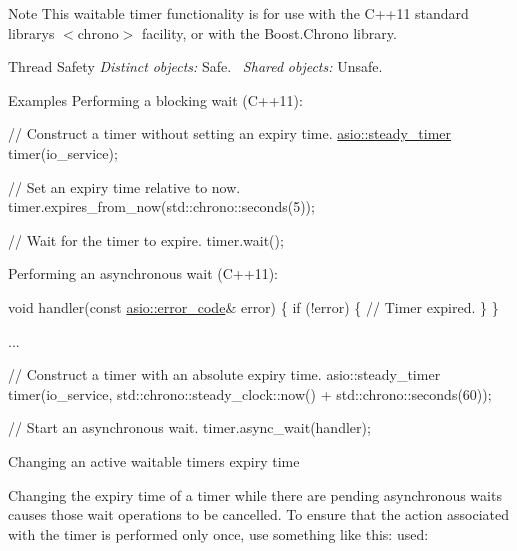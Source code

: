 \begin{DoxyNote}{Note}
This waitable timer functionality is for use with the C++11 standard library\textquotesingle{}s {\ttfamily $<$chrono$>$} facility, or with the Boost.\+Chrono library.
\end{DoxyNote}
\begin{DoxyParagraph}{Thread Safety}
{\itshape Distinct} {\itshape objects\+:} Safe.~\newline
{\itshape Shared} {\itshape objects\+:} Unsafe.
\end{DoxyParagraph}
\begin{DoxyParagraph}{Examples}
Performing a blocking wait (C++11)\+: 
\begin{DoxyCode}
\textcolor{comment}{// Construct a timer without setting an expiry time.}
\hyperlink{namespacewebsocketpp_1_1lib_1_1asio_a156f3dad489fb17e3bc79d2009d2656f}{asio::steady\_timer} timer(io\_service);

\textcolor{comment}{// Set an expiry time relative to now.}
timer.expires\_from\_now(std::chrono::seconds(5));

\textcolor{comment}{// Wait for the timer to expire.}
timer.wait();
\end{DoxyCode}

\end{DoxyParagraph}
\begin{DoxyParagraph}{}
Performing an asynchronous wait (C++11)\+: 
\begin{DoxyCode}
\textcolor{keywordtype}{void} handler(\textcolor{keyword}{const} \hyperlink{classasio_1_1error__code}{asio::error\_code}& error)
\{
  \textcolor{keywordflow}{if} (!error)
  \{
    \textcolor{comment}{// Timer expired.}
  \}
\}

...

\textcolor{comment}{// Construct a timer with an absolute expiry time.}
asio::steady\_timer timer(io\_service,
    std::chrono::steady\_clock::now() + std::chrono::seconds(60));

\textcolor{comment}{// Start an asynchronous wait.}
timer.async\_wait(handler);
\end{DoxyCode}

\end{DoxyParagraph}
\begin{DoxyParagraph}{Changing an active waitable timer\textquotesingle{}s expiry time}

\end{DoxyParagraph}
Changing the expiry time of a timer while there are pending asynchronous waits causes those wait operations to be cancelled. To ensure that the action associated with the timer is performed only once, use something like this\+: used\+:


